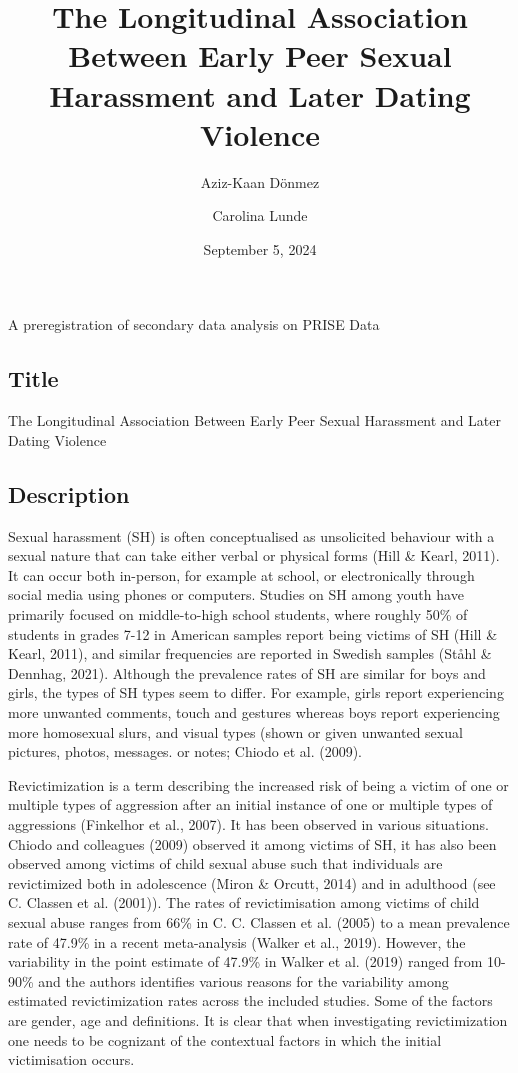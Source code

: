 \documentclass[
]{article}
\title{The Longitudinal Association Between Early Peer Sexual Harassment
and Later Dating Violence}
\author[1]{Aziz-Kaan Dönmez}
\author[1]{Carolina Lunde}
\affil[1]{University of Gothenburg}
\date{September 5, 2024}
\begin{document}
\maketitle


A preregistration of secondary data analysis on PRISE Data

\subsection{Title}\label{title}

The Longitudinal Association Between Early Peer Sexual Harassment and
Later Dating Violence

\subsection{Description}\label{description}

Sexual harassment (SH) is often conceptualised as unsolicited behaviour
with a sexual nature that can take either verbal or physical forms (Hill
\& Kearl, 2011). It can occur both in-person, for example at school, or
electronically through social media using phones or computers. Studies
on SH among youth have primarily focused on middle-to-high school
students, where roughly 50\% of students in grades 7-12 in American
samples report being victims of SH (Hill \& Kearl, 2011), and similar
frequencies are reported in Swedish samples (Ståhl \& Dennhag, 2021).
Although the prevalence rates of SH are similar for boys and girls, the
types of SH types seem to differ. For example, girls report experiencing
more unwanted comments, touch and gestures whereas boys report
experiencing more homosexual slurs, and visual types (shown or given
unwanted sexual pictures, photos, messages. or notes; Chiodo et al.
(2009).

Revictimization is a term describing the increased risk of being a
victim of one or multiple types of aggression after an initial instance
of one or multiple types of aggressions (Finkelhor et al., 2007). It has
been observed in various situations. Chiodo and colleagues (2009)
observed it among victims of SH, it has also been observed among victims
of child sexual abuse such that individuals are revictimized both in
adolescence (Miron \& Orcutt, 2014) and in adulthood (see C. Classen et
al. (2001)). The rates of revictimisation among victims of child sexual
abuse ranges from 66\% in C. C. Classen et al. (2005) to a mean
prevalence rate of 47.9\% in a recent meta-analysis (Walker et al.,
2019). However, the variability in the point estimate of 47.9\% in
Walker et al. (2019) ranged from 10-90\% and the authors identifies
various reasons for the variability among estimated revictimization
rates across the included studies. Some of the factors are gender, age
and definitions. It is clear that when investigating revictimization one
needs to be cognizant of the contextual factors in which the initial
victimisation occurs.
\end{document}
